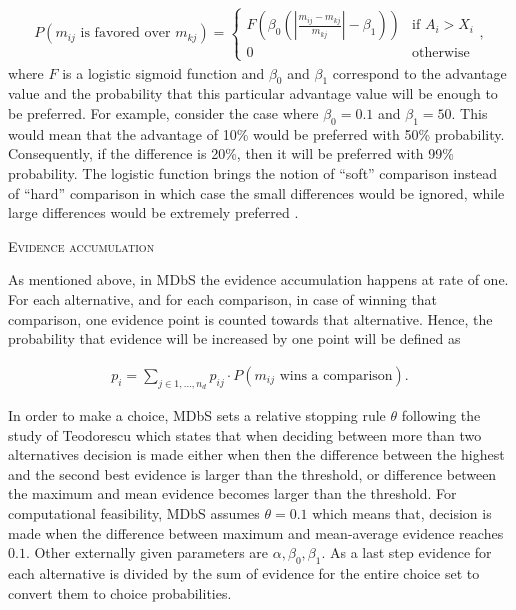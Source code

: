 \documentclass[a4paper,12pt]{article}
\newcommand{\citeyearonly}[1]{\citeyearpar{#1}}
\begin{document}
\begin{align}\label{probabilityOneIsFavored}
    P(m_{ij} \text{ is favored over } m_{kj}) = 
        \begin{cases}
        F(\beta_0 (| \frac{m_{ij} - m_{kj}}{m_{kj}} |- \beta_1)) & \text{if } A_i > X_i \\
        0 & \text{otherwise}
        \end{cases} ,
\end{align}
where $F$ is a logistic sigmoid function and $\beta_0$ and $\beta_1$ correspond to the advantage value and the probability that this particular advantage value will be enough to be preferred. For example, consider the case where $\beta_0 = 0.1$ and $\beta_1 = 50$. This would mean that the advantage of 10\% would be preferred with 50\% probability. Consequently, if the difference is 20\%, then it will be preferred with 99\% probability. The logistic function brings the notion of ``soft'' comparison instead of ``hard'' comparison in which case the small differences would be ignored, while large differences would be extremely preferred \citep{noguchi2018multialternative}.

\textsc{Evidence accumulation}

As mentioned above, in MDbS the evidence accumulation happens at rate of one. For each alternative, and for each comparison, in case of winning that comparison, one evidence point is counted towards that alternative. Hence, the probability that evidence will be increased by one point will be defined as 

\begin{align}\label{probabilityOfEvidenceIncreasing}
    p_i = \sum_{j \in {1, \ldots, n_d}} p_{ij} \cdot P(m_{ij} \text{ wins a comparison}).
\end{align}

In order to make a choice, MDbS sets a relative stopping rule $\theta$ following the study of Teodorescu \citeyearonly{teodorescu2013disentangling} which states that when deciding between more than two alternatives decision is made either when then the difference between the highest and the second best evidence is larger than the threshold, or difference between the maximum and mean evidence becomes larger than the threshold. For computational feasibility, MDbS assumes $\theta = 0.1$ which means that, decision is made when the difference between maximum and mean-average evidence reaches $0.1$. Other externally given parameters are $\alpha, \beta_0, \beta_1$. As a last step evidence for each alternative is divided by the sum of evidence for the entire choice set to convert them to choice probabilities.
\end{document}
